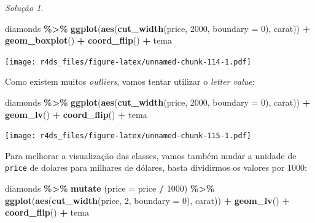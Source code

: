 \documentclass[
]{latex/krantz}
\newenvironment{Shaded}{\begin{snugshade}}{\end{snugshade}}
\newcommand{\AttributeTok}[1]{\textcolor[rgb]{0.13,0.29,0.53}{#1}}
\newcommand{\DecValTok}[1]{\textcolor[rgb]{0.00,0.00,0.81}{#1}}
\newcommand{\FunctionTok}[1]{\textcolor[rgb]{0.13,0.29,0.53}{\textbf{#1}}}
\newcommand{\NormalTok}[1]{#1}
\newcommand{\SpecialCharTok}[1]{\textcolor[rgb]{0.81,0.36,0.00}{\textbf{#1}}}
\theoremstyle{definition}
\theoremstyle{definition}
\theoremstyle{definition}
\theoremstyle{definition}
\theoremstyle{remark}
\newtheorem*{solution}{Solução}
\begin{document}
\begin{solution}
\begin{Shaded}
\begin{Highlighting}[]
\NormalTok{diamonds }\SpecialCharTok{\%\textgreater{}\%}
    \FunctionTok{ggplot}\NormalTok{(}\FunctionTok{aes}\NormalTok{(}\FunctionTok{cut\_width}\NormalTok{(price, }\DecValTok{2000}\NormalTok{, }\AttributeTok{boundary =} \DecValTok{0}\NormalTok{), carat)) }\SpecialCharTok{+}
        \FunctionTok{geom\_boxplot}\NormalTok{() }\SpecialCharTok{+}
        \FunctionTok{coord\_flip}\NormalTok{() }\SpecialCharTok{+}
\NormalTok{        tema}
\end{Highlighting}
\end{Shaded}

\texttt{[image: r4ds\_files/figure-latex/unnamed-chunk-114-1.pdf]}

Como existem muitos \emph{outliers}, vamos tentar utilizar o \emph{letter value}:

\begin{Shaded}
\begin{Highlighting}[]
\NormalTok{diamonds }\SpecialCharTok{\%\textgreater{}\%}
    \FunctionTok{ggplot}\NormalTok{(}\FunctionTok{aes}\NormalTok{(}\FunctionTok{cut\_width}\NormalTok{(price, }\DecValTok{2000}\NormalTok{, }\AttributeTok{boundary =} \DecValTok{0}\NormalTok{), carat)) }\SpecialCharTok{+}
        \FunctionTok{geom\_lv}\NormalTok{() }\SpecialCharTok{+}
        \FunctionTok{coord\_flip}\NormalTok{() }\SpecialCharTok{+}
\NormalTok{        tema}
\end{Highlighting}
\end{Shaded}

\texttt{[image: r4ds\_files/figure-latex/unnamed-chunk-115-1.pdf]}

Para melhorar a visualização das classes, vamos também mudar a unidade de \texttt{price} de dolares para milhares de dólares, basta dividirmos os valores por 1000:

\begin{Shaded}
\begin{Highlighting}[]
\NormalTok{diamonds }\SpecialCharTok{\%\textgreater{}\%}
    \FunctionTok{mutate}\NormalTok{ (}\AttributeTok{price =}\NormalTok{ price }\SpecialCharTok{/} \DecValTok{1000}\NormalTok{) }\SpecialCharTok{\%\textgreater{}\%}
    \FunctionTok{ggplot}\NormalTok{(}\FunctionTok{aes}\NormalTok{(}\FunctionTok{cut\_width}\NormalTok{(price, }\DecValTok{2}\NormalTok{, }\AttributeTok{boundary =} \DecValTok{0}\NormalTok{), carat)) }\SpecialCharTok{+}
        \FunctionTok{geom\_lv}\NormalTok{() }\SpecialCharTok{+}
        \FunctionTok{coord\_flip}\NormalTok{() }\SpecialCharTok{+}
\NormalTok{        tema}
\end{Highlighting}
\end{Shaded}


\end{solution}
\end{document}
